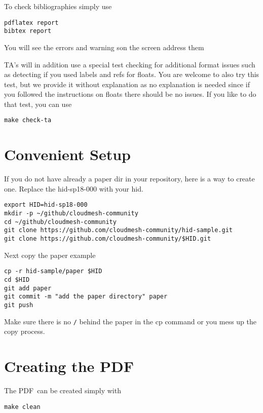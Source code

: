 To check bibliographies simply use

\begin{verbatim}
pdflatex report
bibtex report
\end{verbatim}

You will see the errors and warning son the screen address them

TA's will in addition use a special test checking for additional
format issues such as detecting if you used labels and refs for
floats. You are welcome to also try this test, but we provide it
without explanation as no explanation is needed since if you followed
the instructions on floats there should be no issues. If you like to
do that test, you can use  

\begin{verbatim}
make check-ta
\end{verbatim}

\section{Convenient Setup}

If you do not have already a paper dir in your repository, here is a
way to create one. Replace the hid-sp18-000 with your hid.

\begin{verbatim}
export HID=hid-sp18-000
mkdir -p ~/github/cloudmesh-community
cd ~/github/cloudmesh-community
git clone https://github.com/cloudmesh-community/hid-sample.git
git clone https://github.com/cloudmesh-community/$HID.git
\end{verbatim}

Next copy the paper example

\begin{verbatim}
cp -r hid-sample/paper $HID
cd $HID
git add paper
git commit -m "add the paper directory" paper
git push
\end{verbatim}

Make sure there is no \verb|/| behind the paper in the cp command or you mess up the
copy process.


\section{Creating the PDF}

The PDF\ can be created simply with 

\begin{verbatim}
make clean
\end{verbatim}


